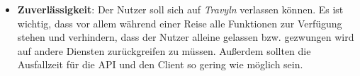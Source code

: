 \begin{itemize}
	\item \textbf{Zuverlässigkeit}: Der Nutzer soll sich auf \textit{Travyln} verlassen können. Es ist wichtig, dass vor allem während einer Reise alle Funktionen zur Verfügung stehen und verhindern, dass der Nutzer alleine gelassen bzw. gezwungen wird auf andere Diensten zurückgreifen zu müssen.
	Außerdem sollten die Ausfallzeit für die API und den Client so gering wie möglich sein.
\end{itemize} 